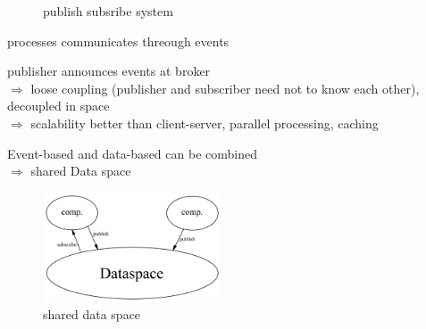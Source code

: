 \documentclass[ngerman,a4paper]{report}
\begin{document}
\begin{compactitem}
\begin{compactitem}
\begin{figure}[h]
	\caption{publish subsribe system}
	\label{img:publish_subscribe}
\end{figure}
\item processes communicates threough events
\item publisher announces events at broker\\
$\Rightarrow$ loose coupling (publisher and subscriber need not to know each other), decoupled in space\\
$\Rightarrow$ scalability better than client-server, parallel processing, caching\\
\end{compactitem}
Event-based and data-based can be combined\\
$\Rightarrow$ shared Data space \\
\begin{figure}[h]
	\centering
	\includegraphics[width=200px]{gfx/shared_data_space.png}
	\caption{shared data space}
	\label{img:shared_data_space}
\end{figure}
\end{compactitem}
\end{document}
